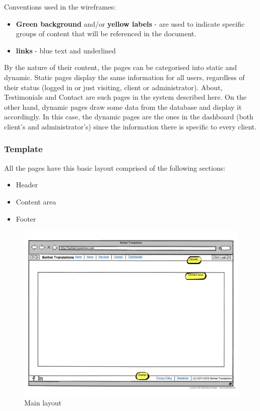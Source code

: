\documentclass{l3proj}
\begin{document}
Conventions used in the wireframes:
\begin{itemize} \itemsep1pt \parskip0pt 
	\item \textbf{Green background} and/or \textbf{yellow labels} - are used to
	indicate specific groups of content that will be referenced in the document.
	\item \textbf{links} - blue text and underlined
\end{itemize}

By the nature of their content, the pages can be categorised into static and
dynamic. Static pages display the same information for all users, regardless of
their status (logged in or just visiting, client or administrator). About,
Testimonials and Contact are such pages in the system described here. On the
other hand, dynamic pages draw some data from the database and display it
accordingly. In this case, the dynamic pages are the ones in the dashboard
(both client’s and administrator’s) since the information there is specific to
every client.



\subsubsection*{Template}
All the pages have this basic layout comprised of the following sections:
\begin{itemize} \itemsep1pt \parskip0pt 
	\item Header
	\item Content area
	\item Footer
\end{itemize}

\begin{figure}
\centering
\includegraphics[width=\linewidth, trim = 0px 50px 0px 50px]
	{wireframes/main-layout}
\caption{Main layout}
\label{wireframes-main-layout}
\end{figure}
\end{document}
